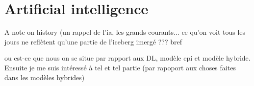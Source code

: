 


\clearpage 


\section{Artificial intelligence}

A note on history (un rappel de l'ia, les grands courants... ce qu'on voit tous les jours ne reflètent qu'une partie de l'iceberg imergé ??? bref

ou est-ce que nous on se situe par rapport aux DL, modèle epi et modèle hybride.
Ensuite je me suis intéressé à tel et tel partie (par rapoport aux choses faites dans les modèles hybrides)


